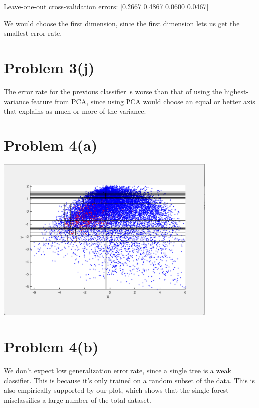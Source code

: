 \documentclass{article}
\begin{document}

Leave-one-out cross-validation errors: [0.2667 0.4867 0.0600 0.0467]

We would choose the first dimension, since the first dimension lets us get the smallest error rate.

\section*{Problem 3(j)}

The error rate for the previous classifier is worse than that of using the highest-variance feature from PCA, since using PCA would choose an equal or better axis that explains as much or more of the variance.

\section*{Problem 4(a)}


\begin{center}
\includegraphics[width=0.8\textwidth]{4a.png}
\end{center}

\section*{Problem 4(b)}

We don't expect low generalization error rate, since a single tree is a weak classifier. This is because it's only trained on a random subset of the data. This is also empirically supported by our plot, which shows that the single forest misclassifies a large number of the total dataset.
\end{document}
